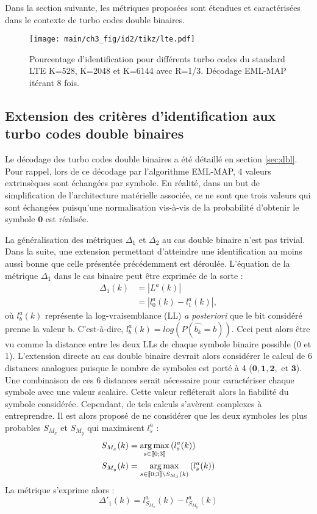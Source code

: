 Dans la section suivante, les métriques proposées sont étendues et caractérisées dans le contexte de turbo codes double 
binaires.

\begin{figure}[!h]
	\centering
	\hspace*{-1cm}
	\texttt{[image: main/ch3\_fig/id2/tikz/lte.pdf]}
	\caption{Pourcentage d'identification pour différents turbo codes du standard LTE K=528, K=2048 et K=6144 avec R=1/3.
	Décodage EML-MAP itérant 8 fois. \label{fig:idLTE}}
\end{figure}

\subsection{Extension des critères d'identification aux turbo codes double binaires}
Le décodage des turbo codes double binaires a été détaillé en section \ref{sec:dbl}. Pour rappel, lors de ce décodage par
l'algorithme EML-MAP, 4 valeurs extrinsèques sont échangées par symbole. En réalité, dans un but de simplification de 
l'architecture matérielle associée, ce ne sont que trois valeurs qui sont échangées puisqu'une normalisation vis-à-vis de 
la probabilité d'obtenir le symbole $\mathbf{0}$ est réalisée. 

La généralisation des métriques $\Delta_1$ et $\Delta_2$ au cas double binaire n'est pas trivial. Dans la suite, une 
extension permettant d'atteindre une identification au moins aussi bonne que celle présentée précédemment est déroulée.
L'équation de la métrique $\Delta_1$ dans le cas binaire peut être exprimée de la sorte : 
\begin{align*}
\Delta_1(k) &= |L^a(k)|\\
			&= |l^a_0(k)-l^a_1(k)|,
\end{align*}
où $l^a_b(k)$ représente la log-vraisemblance (LL) \textit{a posteriori} que le bit considéré prenne la valeur b. 
C'est-à-dire, 
$l^a_b(k) = log\left(P(\hat{b_k} = b)\right)$. Ceci peut alors être vu comme la distance entre les deux LLs de chaque 
symbole
binaire possible (0 et 1). L'extension directe au cas double binaire devrait alors considérer le calcul de 6 distances 
analogues puisque le
nombre de symboles est porté à 4 ($\mathbf{0}, \mathbf{1}, \mathbf{2}, \text{~et~} \mathbf{3}$). Une combinaison 
de ces 6 distances serait nécessaire pour caractériser chaque symbole avec une valeur scalaire. Cette valeur refléterait 
alors la fiabilité du symbole considérée. Cependant, de tels calculs s'avèrent complexes à entreprendre. Il est alors 
proposé de ne considérer que les deux symboles les plus probables $S_{M_x}$ et $S_{M_y}$ qui maximisent $l^a_s$ :
\begin{align*}
S_{M_x}(k) &= \operatorname*{arg\,max}\limits_{s\in\llbracket0;3\rrbracket}\left(l^a_s(k)\right) \\
S_{M_y}(k) &= \operatorname*{arg\,max}\limits_{s\in\llbracket0;3\rrbracket\setminus{S_{M_x}(k)}}\left(l^a_s(k)\right)
\end{align*}
La métrique s'exprime alors :
\begin{equation}
	\Delta'_1(k) = l^a_{S_{M_x}}(k)-l^a_{S_{M_y}}(k)
\end{equation}

